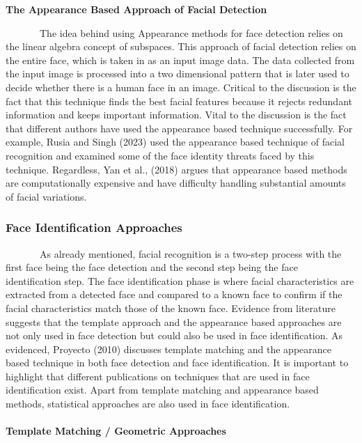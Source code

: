\documentclass[
  12pt,
]{article}
\begin{document}
\textbf{The Appearance Based Approach of Facial Detection}\\
\vspace{-1.2em}

~~~~~~~The idea behind using Appearance methods for face detection
relies on the linear algebra concept of subspaces. This approach of
facial detection relies on the entire face, which is taken in as an
input image data. The data collected from the input image is processed
into a two dimensional pattern that is later used to decide whether
there is a human face in an image. Critical to the discussion is the
fact that this technique finds the best facial features because it
rejects redundant information and keeps important information. Vital to
the discussion is the fact that different authors have used the
appearance based technique successfully. For example, Rusia and Singh
(2023) used the appearance based technique of facial recognition and
examined some of the face identity threats faced by this technique.
Regardless, Yan et al., (2018) argues that appearance based methods are
computationally expensive and have difficulty handling substantial
amounts of facial variations.

\subsubsection{Face Identification
Approaches}\label{face-identification-approaches}

~~~~~~~As already mentioned, facial recognition is a two-step process
with the first face being the face detection and the second step being
the face identification step. The face identification phase is where
facial characteristics are extracted from a detected face and compared
to a known face to confirm if the facial characteristics match those of
the known face. Evidence from literature suggests that the template
approach and the appearance based approaches are not only used in face
detection but could also be used in face identification. As evidenced,
Proyecto (2010) discusses template matching and the appearance based
technique in both face detection and face identification. It is
important to highlight that different publications on techniques that
are used in face identification exist. Apart from template matching and
appearance based methods, statistical approaches are also used in face
identification.

\paragraph{\texorpdfstring{Template Matching / Geometric Approaches\\
}{Template Matching / Geometric Approaches }}\label{template-matching-geometric-approaches}
\end{document}
